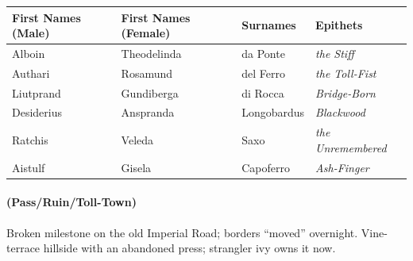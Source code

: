 \begin{longtable}{|p{}|p{}|p{}|p{}|}
\hline
\textbf{First Names (Male)} & \textbf{First Names (Female)} & \textbf{Surnames} & \textbf{Epithets} \\
\hline
Alboin & Theodelinda & da Ponte & \textit{the Stiff} \\
\hline
Authari & Rosamund & del Ferro & \textit{the Toll-Fist} \\
\hline
Liutprand & Gundiberga & di Rocca & \textit{Bridge-Born} \\
\hline
Desiderius & Anspranda & Longobardus & \textit{Blackwood} \\
\hline
Ratchis & Veleda & Saxo & \textit{the Unremembered} \\
\hline
Aistulf & Gisela & Capoferro & \textit{Ash-Finger} \\
\hline
\end{longtable}

\paragraph*{(Pass/Ruin/Toll-Town)} Broken milestone on the old Imperial Road; borders ``moved'' overnight. Vine-terrace hillside with an abandoned press; strangler ivy owns it now.

